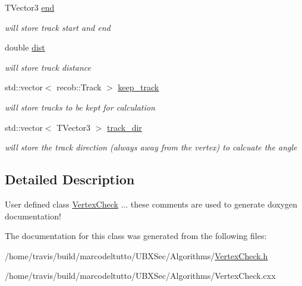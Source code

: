 \begin{DoxyCompactItemize}
\item 
\hypertarget{classubxsec_1_1VertexCheck_ad416fe53ee649eb9a9e310e9abe32a0b}{T\-Vector3 \hyperlink{classubxsec_1_1VertexCheck_ad416fe53ee649eb9a9e310e9abe32a0b}{end}}\label{classubxsec_1_1VertexCheck_ad416fe53ee649eb9a9e310e9abe32a0b}

\begin{DoxyCompactList}\small\item\em will store track start and end \end{DoxyCompactList}\item 
\hypertarget{classubxsec_1_1VertexCheck_aaa817d271e0bb5e44d07ef5c21ad52cc}{double \hyperlink{classubxsec_1_1VertexCheck_aaa817d271e0bb5e44d07ef5c21ad52cc}{dist}}\label{classubxsec_1_1VertexCheck_aaa817d271e0bb5e44d07ef5c21ad52cc}

\begin{DoxyCompactList}\small\item\em will store track distance \end{DoxyCompactList}\item 
\hypertarget{classubxsec_1_1VertexCheck_a6046f472792f70321896604580b758e6}{std\-::vector$<$ recob\-::\-Track $>$ \hyperlink{classubxsec_1_1VertexCheck_a6046f472792f70321896604580b758e6}{keep\-\_\-track}}\label{classubxsec_1_1VertexCheck_a6046f472792f70321896604580b758e6}

\begin{DoxyCompactList}\small\item\em will store tracks to be kept for calculation \end{DoxyCompactList}\item 
\hypertarget{classubxsec_1_1VertexCheck_a037d7571e3f32aee10ccf100e3a34931}{std\-::vector$<$ T\-Vector3 $>$ \hyperlink{classubxsec_1_1VertexCheck_a037d7571e3f32aee10ccf100e3a34931}{track\-\_\-dir}}\label{classubxsec_1_1VertexCheck_a037d7571e3f32aee10ccf100e3a34931}

\begin{DoxyCompactList}\small\item\em will store the track direction (always away from the vertex) to calcuate the angle \end{DoxyCompactList}\end{DoxyCompactItemize}


\subsection{Detailed Description}
User defined class \hyperlink{classubxsec_1_1VertexCheck}{Vertex\-Check} ... these comments are used to generate doxygen documentation! 

The documentation for this class was generated from the following files\-:\begin{DoxyCompactItemize}
\item 
/home/travis/build/marcodeltutto/\-U\-B\-X\-Sec/\-Algorithms/\hyperlink{VertexCheck_8h}{Vertex\-Check.\-h}\item 
/home/travis/build/marcodeltutto/\-U\-B\-X\-Sec/\-Algorithms/Vertex\-Check.\-cxx\end{DoxyCompactItemize}
